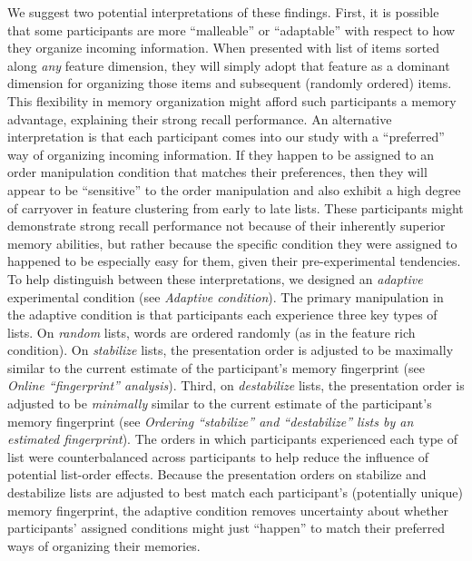 \documentclass[11pt]{article}
\begin{document}
We suggest two potential interpretations of these findings. First, it is
possible that some participants are more ``malleable'' or ``adaptable'' with
respect to how they organize incoming information. When presented with list of
items sorted along \textit{any} feature dimension, they will simply adopt that
feature as a dominant dimension for organizing those items and subsequent
(randomly ordered) items. This flexibility in memory organization might afford
such participants a memory advantage, explaining their strong recall
performance. An alternative interpretation is that each participant comes into
our study with a ``preferred'' way of organizing incoming information. If they
happen to be assigned to an order manipulation condition that matches their
preferences, then they will appear to be ``sensitive'' to the order
manipulation and also exhibit a high degree of carryover in feature clustering
from early to late lists. These participants might demonstrate strong recall
performance not because of their inherently superior memory abilities, but
rather because the specific condition they were assigned to happened to be
especially easy for them, given their pre-experimental tendencies. To help
distinguish between these interpretations, we designed an \textit{adaptive}
experimental condition (see \textit{Adaptive condition}). The primary
manipulation in the adaptive condition is that participants each experience
three key types of lists. On \textit{random} lists, words are ordered randomly
(as in the feature rich condition). On \textit{stabilize} lists, the
presentation order is adjusted to be maximally similar to the current estimate
of the participant's memory fingerprint (see \textit{Online “fingerprint”
analysis}). Third, on \textit{destabilize} lists, the presentation order is
adjusted to be \textit{minimally} similar to the current estimate of the
participant's memory fingerprint (see \textit{Ordering ``stabilize'' and
``destabilize'' lists by an estimated fingerprint}). The orders in which
participants experienced each type of list were counterbalanced across
participants to help reduce the influence of potential list-order effects.
Because the presentation orders on stabilize and destabilize lists are adjusted
to best match each participant's (potentially unique) memory fingerprint, the
adaptive condition removes uncertainty about whether participants' assigned
conditions might just ``happen'' to match their preferred ways of organizing
their memories.
\end{document}
